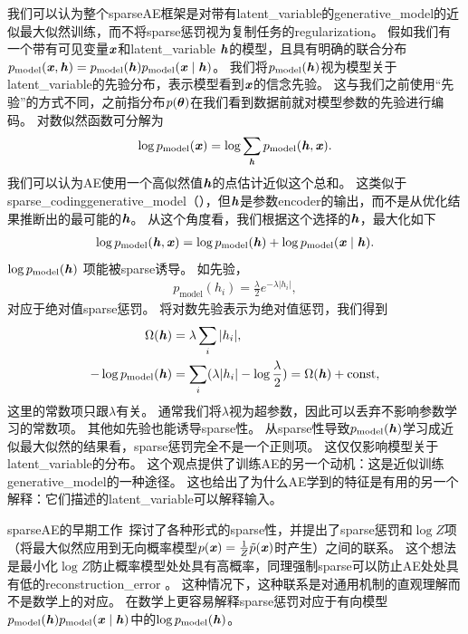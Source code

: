 我们可以认为整个\gls{sparse}\gls{AE}框架是对带有\gls{latent_variable}的\gls{generative_model}的近似最大似然训练，而不将\gls{sparse}惩罚视为复制任务的\gls{regularization}。
假如我们有一个带有可见变量$\boldsymbol{\mathit{x}}$和\gls{latent_variable} $\boldsymbol{\mathit{h}}$的模型，且具有明确的联合分布$p_{\text{model}}(\boldsymbol{\mathit{x}},\boldsymbol{\mathit{h}})=p_{\text{model}}(\boldsymbol{\mathit{h}})p_{\text{model}} (\boldsymbol{\mathit{x}} \mid \boldsymbol{\mathit{h}})$。
我们将$p_{\text{model}}(\boldsymbol{\mathit{h}})$视为模型关于\gls{latent_variable}的先验分布，表示模型看到$\boldsymbol{\mathit{x}}$的信念先验。
这与我们之前使用``先验''的方式不同，之前指分布$p(\boldsymbol{\theta})$在我们看到数据前就对模型参数的先验进行编码。
对数似然函数可分解为
\begin{align}
\log p_{\text{model}}(\boldsymbol{\mathit{x}})=\log \sum_{\boldsymbol{\mathit{h}}} p_{\text{model}}(\boldsymbol{\mathit{h}}, \boldsymbol{\mathit{x}}) .
\end{align}
我们可以认为\gls{AE}使用一个高似然值$\boldsymbol{\mathit{h}}$的点估计近似这个总和。
这类似于\gls{sparse_coding}\gls{generative_model}（），但$\boldsymbol{\mathit{h}}$是参数\gls{encoder}的输出，而不是从优化结果推断出的最可能的$\boldsymbol{\mathit{h}}$。
从这个角度看，我们根据这个选择的$\boldsymbol{\mathit{h}}$，最大化如下
\begin{align}
\log p_{\text{model}}(\boldsymbol{\mathit{h}}, \boldsymbol{\mathit{x}})=\log p_{\text{model}}(\boldsymbol{\mathit{h}}) + \log p_{\text{model}}(\boldsymbol{\mathit{x}} \mid \boldsymbol{\mathit{h}}) .
\end{align}
$\log p_{\text{model}}(\boldsymbol{\mathit{h}}) $ 项能被\gls{sparse}诱导。
如先验，
\begin{align}
p_{\text{model}}(h_i) = \frac{\lambda}{2} e^{-\lambda | h_i |},
\end{align}
对应于绝对值\gls{sparse}惩罚。
将对数先验表示为绝对值惩罚，我们得到
\begin{align}
\Omega(\boldsymbol{\mathit{h}}) &= \lambda \sum_{i} | h_i  |,\\ 
-\log p_{\text{model}}(\boldsymbol{\mathit{h}}) &= 
\sum_i (\lambda | h_i | - \log \frac{\lambda}{2}) = \Omega(\boldsymbol{\mathit{h}}) + \text{const},
\end{align}
这里的常数项只跟$\lambda$有关。
通常我们将$\lambda$视为超参数，因此可以丢弃不影响参数学习的常数项。
其他如先验也能诱导\gls{sparse}性。
从\gls{sparse}性导致$p_{\text{model}}(\boldsymbol{\mathit{h}})$学习成近似最大似然的结果看，\gls{sparse}惩罚完全不是一个正则项。
这仅仅影响模型关于\gls{latent_variable}的分布。
这个观点提供了训练\gls{AE}的另一个动机：这是近似训练\gls{generative_model}的一种途径。
这也给出了为什么\gls{AE}学到的特征是有用的另一个解释：它们描述的\gls{latent_variable}可以解释输入。


\gls{sparse}\gls{AE}的早期工作~\citep{ranzato-07-small,ranzato-08-small}探讨了各种形式的\gls{sparse}性，并提出了\gls{sparse}惩罚和$\log  Z$项（将最大似然应用到无向概率模型$p(\boldsymbol{\mathit{x}})=\frac{1}{Z}\tilde{p}(\boldsymbol{\mathit{x}})$时产生）之间的联系。
这个想法是最小化$\log Z$防止概率模型处处具有高概率，同理强制\gls{sparse}可以防止\gls{AE}处处具有低的\gls{reconstruction_error} 。
这种情况下，这种联系是对通用机制的直观理解而不是数学上的对应。
在数学上更容易解释\gls{sparse}惩罚对应于有向模型$p_{\text{model}}(\boldsymbol{\mathit{h}})p_{\text{model}}(\boldsymbol{\mathit{x}} \mid \boldsymbol{\mathit{h}}) $中的$\log p_{\text{model}}(\boldsymbol{\mathit{h}})$。


